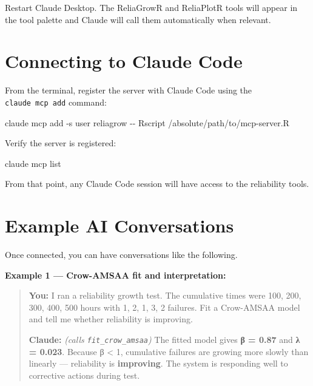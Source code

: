 \documentclass[
  letterpaper,
  DIV=11,
  numbers=noendperiod]{scrreprt}
\newenvironment{Shaded}{\begin{snugshade}}{\end{snugshade}}
\newcommand{\AttributeTok}[1]{\textcolor[rgb]{0.40,0.45,0.13}{#1}}
\newcommand{\ExtensionTok}[1]{\textcolor[rgb]{0.00,0.23,0.31}{#1}}
\newcommand{\NormalTok}[1]{\textcolor[rgb]{0.00,0.23,0.31}{#1}}
\begin{document}
Restart Claude Desktop. The ReliaGrowR and ReliaPlotR tools will appear
in the tool palette and Claude will call them automatically when
relevant.

\section{Connecting to Claude Code}\label{connecting-to-claude-code}

From the terminal, register the server with Claude Code using the
\texttt{claude\ mcp\ add} command:

\begin{Shaded}
\begin{Highlighting}[]
\ExtensionTok{claude}\NormalTok{ mcp add }\AttributeTok{{-}s}\NormalTok{ user reliagrow }\AttributeTok{{-}{-}}\NormalTok{ Rscript /absolute/path/to/mcp{-}server.R}
\end{Highlighting}
\end{Shaded}

Verify the server is registered:

\begin{Shaded}
\begin{Highlighting}[]
\ExtensionTok{claude}\NormalTok{ mcp list}
\end{Highlighting}
\end{Shaded}

From that point, any Claude Code session will have access to the
reliability tools.

\section{Example AI Conversations}\label{example-ai-conversations}

Once connected, you can have conversations like the following.

\textbf{Example 1 --- Crow-AMSAA fit and interpretation:}

\begin{quote}
\textbf{You:} I ran a reliability growth test. The cumulative times were
100, 200, 300, 400, 500 hours with 1, 2, 1, 3, 2 failures. Fit a
Crow-AMSAA model and tell me whether reliability is improving.

\textbf{Claude:} \emph{(calls \texttt{fit\_crow\_amsaa})} The fitted
model gives \textbf{β = 0.87} and \textbf{λ = 0.023}. Because β
\textless{} 1, cumulative failures are growing more slowly than linearly
--- reliability is \textbf{improving}. The system is responding well to
corrective actions during test.
\end{quote}
\end{document}
